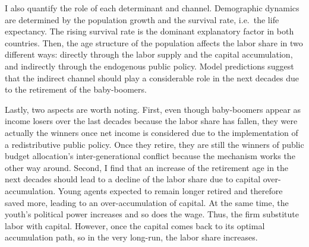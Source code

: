 \documentclass[
]{article}
\begin{document}
I also quantify the role of each determinant and channel.
Demographic dynamics are determined by the population growth and the survival rate, i.e.~the life expectancy. The rising survival rate is the dominant explanatory factor in both countries. Then, the age structure of the population affects the labor share in two different ways: directly through the labor supply and the capital accumulation, and indirectly through the endogenous public policy. Model predictions suggest that the indirect channel should play a considerable role in the next decades due to the retirement of the baby-boomers.

Lastly, two aspects are worth noting. First, even though baby-boomers appear as income losers over the last decades because the labor share has fallen, they were actually the winners once net income is considered due to the implementation of a redistributive public policy. Once they retire, they are still the winners of public budget allocation's inter-generational conflict because the mechanism works the other way around.
Second, I find that an increase of the retirement age in the next decades should lead to a decline of the labor share due to capital over-accumulation.
Young agents expected to remain longer retired and therefore saved more, leading to an over-accumulation of capital. At the same time, the youth's political power increases and so does the wage. Thus, the firm substitute labor with capital. However, once the capital comes back to its optimal accumulation path, so in the very long-run, the labor share increases.
\end{document}
